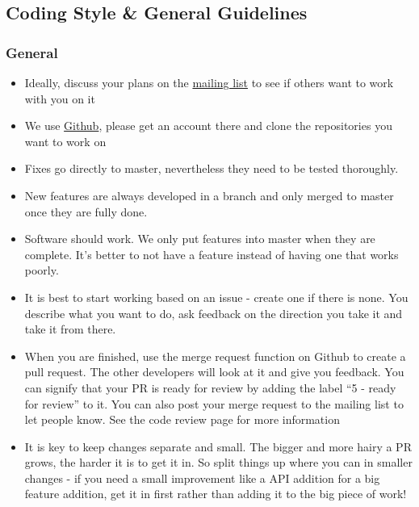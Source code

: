 \documentclass[letterpaper,10pt,english]{sphinxmanual}
\begin{document}
\subsection{Coding Style \& General Guidelines}
\label{general/codingguidelines:coding-style-general-guidelines}\label{general/codingguidelines::doc}\label{general/codingguidelines:coding-style-guidelines-label}

\subsubsection{General}
\label{general/codingguidelines:general}\begin{itemize}
\item {} 
Ideally, discuss your plans on the \href{https://mailman.owncloud.org/mailman/listinfo/devel}{mailing list} to see if others want to work with you on it

\item {} 
We use \href{https://github.com/owncloud}{Github}, please get an account there and clone the repositories you want to work on

\item {} 
Fixes go directly to master, nevertheless they need to be tested thoroughly.

\item {} 
New features are always developed in a branch and only merged to master once they are fully done.

\item {} 
Software should work. We only put features into master when they are complete. It's better to not have a feature instead of having one that works poorly.

\item {} 
It is best to start working based on an issue - create one if there is none. You describe what you want to do, ask feedback on the direction you take it and take it from there.

\item {} 
When you are finished, use the merge request function on Github to create a pull request. The other developers will look at it and give you feedback. You can signify that your PR is ready for review by adding the label ``5 - ready for review'' to it. You can also post your merge request to the mailing list to let people know. See the code review page for more information

\item {} 
It is key to keep changes separate and small. The bigger and more hairy a PR grows, the harder it is to get it in. So split things up where you can in smaller changes - if you need a small improvement like a API addition for a big feature addition, get it in first rather than adding it to the big piece of work!


\end{itemize}
\end{document}

